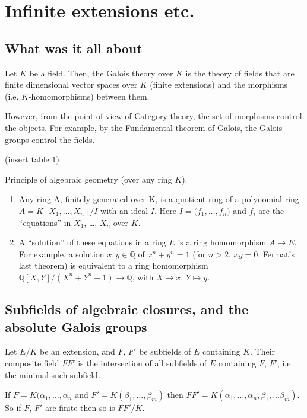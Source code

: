 
\section{Infinite extensions etc.}

\subsection{What was it all about}

Let $K$ be a field. Then, the Galois theory over $K$ is the theory of fields that are finite dimensional vector spaces over $K$ (finite extensions) and the morphisms (i.e. $K$-homomorphisms) between them.

However, from the point of view of Category theory, the set of morphisms control the objects. For example, by the Fundamental theorem of Galois, the Galois groups control the fields.

(insert table 1)

Principle of algebraic geometry (over any ring $K$). 
\begin{enumerate}
\item Any ring A, finitely generated over K, is a quotient ring of a polynomial ring $A = K[X_1, \dotsc, X_n]/I$ with an ideal $I$. Here $I = \big(f_1, \dotsc, f_n\big)$ and $f_i$ are the ``equations'' in $X_1$, \ldots, $X_n$ over $K$.
\item A ``solution'' of these equations in a ring $E$ is a ring homomorphism $A \rightarrow E$. For example, a solution $x, y \in \mathbb{Q}$ of $x^n + y^n = 1$ (for $n > 2$, $xy = 0$, Fermat's last theorem) is equivalent to a ring homomorphism $\mathbb{Q}[X, Y]/(X^n + Y^n -1) \rightarrow \mathbb{Q}$, with $X \mapsto x$, $Y \mapsto y$.
\end{enumerate}

\subsection{Subfields of algebraic closures, and the absolute Galois groups}

\begin{definition}
  \label{def:102}
  Let $E/K$ be an extension, and $F$, $F'$ be subfields of $E$ containing $K$. Their composite field $FF'$ is the intersection of all subfields of $E$ containing $F$, $F'$, i.e. the minimal such subfield.
\end{definition}

If $F = K(\alpha_1, \dotsc, \alpha_n$ and $F' = K(\beta_1, \dotsc, \beta_m)$ then $FF' = K(\alpha_1, \dotsc, \alpha_n, \beta_1, \dotsc \beta_m)$. So if $F$, $F'$ are finite then so is $FF'/K$.

